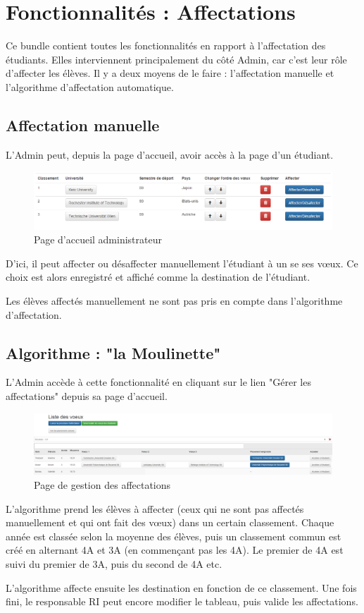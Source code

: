 \chapter{Fonctionnalités : Affectations}

Ce bundle contient toutes les fonctionnalités en rapport à l'affectation des étudiants.
Elles interviennent principalement du côté Admin, car c'est leur rôle d'affecter les élèves. Il y a deux moyens de le faire : l'affectation manuelle et l'algorithme d'affectation automatique.

\section{Affectation manuelle}

L'Admin peut, depuis la page d'accueil, avoir accès à la page d'un étudiant. 
 \bigbreak
 \begin{figure}[H]
	\centering
 \includegraphics[scale=0.5]{images/voeux_etud_vupar_admin.PNG}
	\caption{Page d'accueil administrateur}
	\label{gm}
\end{figure}
 
\bigbreak
D'ici, il peut affecter ou désaffecter manuellement l'étudiant à un se ses vœux.
Ce choix est alors enregistré et affiché comme la destination de l'étudiant.

Les élèves affectés manuellement ne sont pas pris en compte dans l'algorithme d'affectation.

\section{Algorithme : "la Moulinette"}

L'Admin accède à cette fonctionnalité en cliquant sur le lien "Gérer les affectations" depuis sa page d'accueil.
\bigbreak
\begin{figure}[H]
	\centering
	\includegraphics[scale=0.22]{images/Liste_de_voeux_admin.PNG}
	\caption{Page de gestion des affectations}
	\label{ga}
\end{figure}
\bigbreak
L'algorithme prend les élèves à affecter (ceux qui ne sont pas affectés manuellement et qui ont fait des vœux) dans un certain classement. Chaque année est classée selon la moyenne des élèves, puis un classement commun est créé en alternant 4A et 3A (en commençant pas les 4A). Le premier de 4A est suivi du premier de 3A, puis du second de 4A etc.

L'algorithme affecte ensuite les destination en fonction de ce classement.
Une fois fini, le responsable RI peut encore modifier le tableau, puis valide les affectations.

